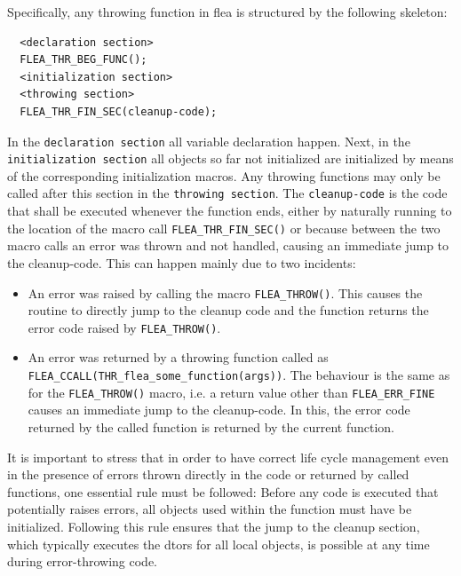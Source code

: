 \documentclass[a4paper,11pt]{scrartcl}
\begin{document}
Specifically, any throwing function in flea is structured by the following skeleton:
\begin{verbatim}
  <declaration section>
  FLEA_THR_BEG_FUNC();
  <initialization section>
  <throwing section> 
  FLEA_THR_FIN_SEC(cleanup-code);
\end{verbatim}
In the \verb#declaration section# all variable declaration happen. Next, in the \verb#initialization section#  
all objects so far not initialized are initialized by means of the
corresponding initialization macros. Any throwing functions may only be called
after this section in the \verb#throwing section#. 
The \verb#cleanup-code# is the code that shall be executed whenever the function ends,
either by naturally running to the location of the macro call
\verb#FLEA_THR_FIN_SEC()# or because between the two macro calls an error was
thrown and not handled, causing an immediate jump to the cleanup-code. This can happen mainly due to two incidents:
\begin{itemize}
  \item An error was raised by calling the macro \verb#FLEA_THROW()#. This
    causes the routine to directly jump to the cleanup code and the function
    returns the error code raised by \verb#FLEA_THROW()#. 
  \item An error was returned by a throwing function called as
    \verb#FLEA_CCALL(THR_flea_some_function(args))#. The behaviour is the same
    as for the \verb#FLEA_THROW()# macro, i.e. a return value other than
    \verb#FLEA_ERR_FINE# causes an immediate jump to the cleanup-code. In this, the error code returned by the
    called function is returned by the current function.
\end{itemize}

It is important to stress that in order to have correct life cycle management even in the presence of errors
thrown directly in the code or returned by called functions, one essential rule must be followed:
Before any code is executed that potentially raises errors, all objects 
used within the function must have be initialized. 
Following this rule ensures that the jump to the cleanup section, which
typically executes the dtors for all local objects, is possible at any time
during error-throwing code.
\end{document}
